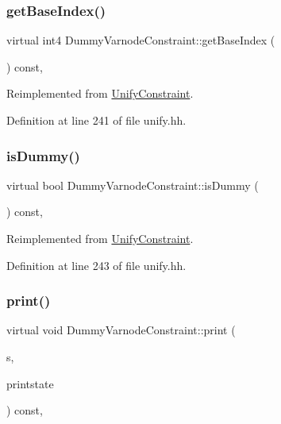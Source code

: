 \subsubsection{\texorpdfstring{getBaseIndex()}{getBaseIndex()}}
{\footnotesize\ttfamily virtual int4 Dummy\+Varnode\+Constraint\+::get\+Base\+Index (\begin{DoxyParamCaption}\item[{void}]{ }\end{DoxyParamCaption}) const\hspace{0.3cm}{\ttfamily [inline]}, {\ttfamily [virtual]}}



Reimplemented from \mbox{\hyperlink{class_unify_constraint_a44f0164f38ac1fdc44fc73ebe7678de1}{Unify\+Constraint}}.



Definition at line 241 of file unify.\+hh.

\mbox{\label{class_dummy_varnode_constraint_adabb4d2a9cc6eaaed1c2d98e1eb054ad}} 
\subsubsection{\texorpdfstring{isDummy()}{isDummy()}}
{\footnotesize\ttfamily virtual bool Dummy\+Varnode\+Constraint\+::is\+Dummy (\begin{DoxyParamCaption}\item[{void}]{ }\end{DoxyParamCaption}) const\hspace{0.3cm}{\ttfamily [inline]}, {\ttfamily [virtual]}}



Reimplemented from \mbox{\hyperlink{class_unify_constraint_a260263ddd2fea5ac847302d12feeb031}{Unify\+Constraint}}.



Definition at line 243 of file unify.\+hh.

\mbox{\label{class_dummy_varnode_constraint_ab652913e2a7a3dc1ac3fc44f10807d5f}} 
\subsubsection{\texorpdfstring{print()}{print()}}
{\footnotesize\ttfamily virtual void Dummy\+Varnode\+Constraint\+::print (\begin{DoxyParamCaption}\item[{ostream \&}]{s,  }\item[{\mbox{\hyperlink{class_unify_c_printer}{Unify\+C\+Printer}} \&}]{printstate }\end{DoxyParamCaption}) const\hspace{0.3cm}{\ttfamily [inline]}, {\ttfamily [virtual]}}



